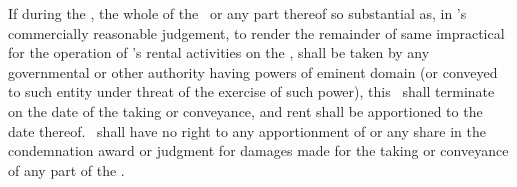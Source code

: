 If during the \termoflease, the whole of the \property\ or any part thereof so substantial as, in \lessor’s commercially reasonable judgement, to render the remainder of same impractical for the operation of \lessor’s rental activities on the \property, shall be taken by any governmental or other authority having powers of eminent domain (or conveyed to such entity under threat of the exercise of such power), this \amendmentTitle\ shall terminate on the date of the taking or conveyance, and rent shall be apportioned to the date thereof. \lessee\ shall have no right to any apportionment of or any share in the condemnation award or judgment for damages made for the taking or conveyance of any part of the \property.

